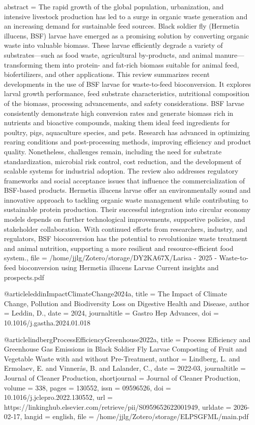 {{{{{  abstract = {The rapid growth of the global population, urbanization, and intensive livestock production has led to a surge in organic waste generation and an increasing demand for sustainable feed sources. Black soldier fly (Hermetia illucens, BSF) larvae have emerged as a promising solution by converting organic waste into valuable biomass. These larvae efficiently degrade a variety of substrates—such as food waste, agricultural by-products, and animal manure—transforming them into protein- and fat-rich biomass suitable for animal feed, biofertilizers, and other applications. This review summarizes recent developments in the use of BSF larvae for waste-to-feed bioconversion. It explores larval growth performance, feed substrate characteristics, nutritional composition of the biomass, processing advancements, and safety considerations. BSF larvae consistently demonstrate high conversion rates and generate biomass rich in nutrients and bioactive compounds, making them ideal feed ingredients for poultry, pigs, aquaculture species, and pets. Research has advanced in optimizing rearing conditions and post-processing methods, improving efficiency and product quality. Nonetheless, challenges remain, including the need for substrate standardization, microbial risk control, cost reduction, and the development of scalable systems for industrial adoption. The review also addresses regulatory frameworks and social acceptance issues that influence the commercialization of BSF-based products. Hermetia illucens larvae offer an environmentally sound and innovative approach to tackling organic waste management while contributing to sustainable protein production. Their successful integration into circular economy models depends on further technological improvements, supportive policies, and stakeholder collaboration. With continued efforts from researchers, industry, and regulators, BSF bioconversion has the potential to revolutionize waste treatment and animal nutrition, supporting a more resilient and resource-efficient food system.},
  file = {/home/jjlg/Zotero/storage/DY2KA67X/Larisa - 2025 - Waste-to-feed bioconversion using Hermetia illucens Larvae Current insights and prospects.pdf}
}

@article{leddinImpactClimateChange2024a,
  title = {The Impact of Climate Change, Pollution and Biodiversity Loss on Digestive Health and Disease},
  author = {Leddin, D.},
  date = {2024},
  journaltitle = {Gastro Hep Advances},
  doi = {10.1016/j.gastha.2024.01.018}
}

@article{lindbergProcessEfficiencyGreenhouse2022a,
  title = {Process Efficiency and Greenhouse Gas Emissions in Black Soldier Fly Larvae Composting of Fruit and Vegetable Waste with and without Pre-Treatment},
  author = {Lindberg, L. and Ermolaev, E. and Vinnerås, B. and Lalander, C.},
  date = {2022-03},
  journaltitle = {Journal of Cleaner Production},
  shortjournal = {Journal of Cleaner Production},
  volume = {338},
  pages = {130552},
  issn = {09596526},
  doi = {10.1016/j.jclepro.2022.130552},
  url = {https://linkinghub.elsevier.com/retrieve/pii/S0959652622001949},
  urldate = {2026-02-17},
  langid = {english},
  file = {/home/jjlg/Zotero/storage/ELPSGFML/main.pdf}
}

}}}}
